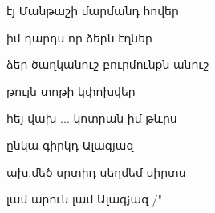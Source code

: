                             էյ  Մանթաշի մարմանդ հովեր


                            իմ դարդս որ ձերն էղներ


                            ձեր ծաղկանուշ բուրմունքն անուշ

                            թույն տոթի կփոխվեր 

                            հեյ վախ ... կոտրան իմ թևրս


                            ընկա գիրկդ Ալագյազ


                            ախ.մեծ սրտիդ սեղմեմ   սիրտս

                            լամ արուն լամ Ալագjազ  /" 
